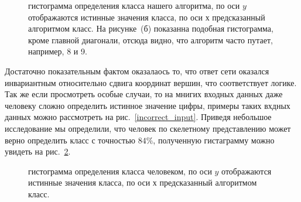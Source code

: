 \documentclass[12pt, twoside]{article}
\begin{document}
\begin{figure}[h]
\begin{minipage}[h]{0.49\linewidth}
\end{minipage}
\caption{гистограмма определения класса нашего алгоритма, по оси $y$ отображаются истинные значения класса, по оси $х$ предсказанный алгоритмом класс. На рисунке~(б) показанна подобная гистограмма, кроме главной диагонали, отсюда видно, что алгоритм часто путает, например, 8 и 9.}
\label{heat_maps}
\end{figure}

Достаточно показательным фактом оказалаось то, что ответ сети оказался инвариантным относительно сдвига координат вершин, что соответствует логике. Так же если просмотреть особые случаи, то на мнигих входных данных даже человеку сложно определить истинное значение цифры, примеры таких вхдных данных можно рассмотреть на рис.~\ref{incorrect_input}. Приведя небольшое исследование мы определили, что человек по скелетному представлению может верно определить класс с точностью $84\%$, полученную гистаграмму можно увидеть на рис.~\ref{my_results}.

\begin{figure}[h]
\caption{гистограмма определения класса человеком, по оси $y$ отображаются истинные значения класса, по оси $х$ предсказанный алгоритмом класс.}
\label{my_results}
\end{figure}
\end{document}
